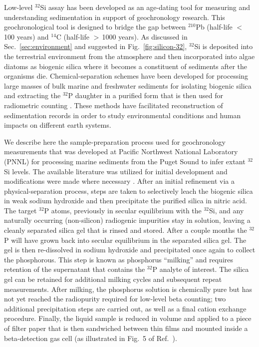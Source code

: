 \documentclass[final,5p]{elsarticle}
\def\si{$^{32}$Si\xspace}
\def\p{$^{32}$P\xspace}
\begin{document}
Low-level \si assay has been developed as an age-dating tool for measuring and understanding sedimentation in support of geochronology research. This geochronological tool is designed to bridge the gap between $^{210}$Pb (half-life $<$\,100 years) and $^{14}$C (half-life $>$\,1000 years). As discussed in Sec.\ \ref{sec:environment} and suggested in Fig.\ \ref{fig:silicon-32}, \si is deposited into the terrestrial environment from the atmosphere and then incorporated into algae diatoms as biogenic silica where it becomes a constituent of sediments after the organisms die. Chemical-separation schemes have been developed for processing large masses of bulk marine and freshwater sediments for isolating biogenic silica and extracting the  \p daughter in a purified form that is then used for radiometric counting \cite{fifield,morgenstern2}. These methods have facilitated reconstruction of sedimentation records in order to study environmental conditions and human impacts on different earth systems.

We describe here the sample-preparation process used for geochronology measurements that was developed at Pacific Northwest National Laboratory (PNNL) for processing marine sediments from the Puget Sound to infer extant \si levels. The available literature was utilized for initial development and modifications were made where necessary \cite{fifield,morgenstern2,demaster,benitez,conley}. After an initial refinement via a physical-separation process, steps are taken to selectively leach the biogenic silica in weak sodium hydroxide and then precipitate the purified silica in nitric acid. The target \p atoms, previously in secular equilibrium with the \si, and any naturally occurring (non-silicon) radiogenic impurities stay in solution, leaving a cleanly separated silica gel that is rinsed and stored. After a couple months the \p will have grown back into secular equilibrium in the separated silica gel. The gel is then re-dissolved in sodium hydroxide and precipitated once again to collect the phosphorous. This step is known as phosphorus ``milking'' and requires retention of the supernatant that contains the \p analyte of interest. The silica gel can be retained for additional milking cycles and subsequent repeat measurements. After milking, the phosphorus solution is chemically pure but has not yet reached the radiopurity required for low-level beta counting; two additional precipitation steps are carried out, as well as a final cation exchange procedure. Finally, the liquid sample is reduced in volume and applied to a piece of filter paper that is then sandwiched between thin films and mounted inside a beta-detection gas cell (as illustrated in Fig.~5 of Ref.~\cite{bids1}).
\end{document}
